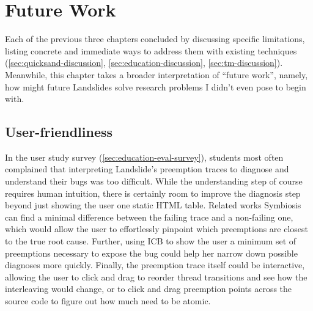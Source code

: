 \chapter{Future Work}
\label{chap:warpzone}

Each of the previous three chapters concluded by
discussing specific limitations,
listing concrete and immediate ways to address them
with existing techniques
(\cref{sec:quicksand-discussion},
\cref{sec:education-discussion},
\cref{sec:tm-discussion}).
Meanwhile, this chapter takes a broader interpretation of ``future work'',
namely,
how might future Landslides solve research problems I didn't even pose to begin with.

\section{User-friendliness}
\label{sec:future-friendly}

In the user study survey (\cref{sec:education-eval-survey}),
students most often complained
that interpreting Landslide's preemption traces to diagnose and understand their bugs was too difficult.
While the understanding step of course requires human intuition,
there is certainly room to improve the diagnosis step beyond just showing the user one static HTML table.
Related works  Symbiosis \cite{symbiosis}
can find a minimal difference between the failing trace and a non-failing one,
which would allow the user to effortlessly pinpoint which preemptions are closest to the true root cause.
Further, using ICB \cite{chess-icb} to show the user a minimum set of preemptions necessary to expose the bug
could help her narrow down possible diagnoses more quickly.
Finally, the preemption trace itself could be interactive,
allowing the user to click and drag to reorder thread transitions and see how the interleaving would change,
or to click and drag preemption points across the source code to figure out how much need to be atomic.


